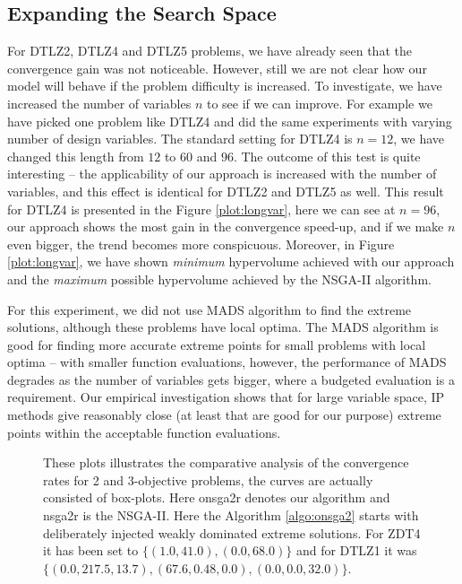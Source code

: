 \documentclass[journal]{IEEEtran}
\let\MYoriglatexcaption\caption
\renewcommand{\caption}[2][\relax]{\MYoriglatexcaption[#2]{#2}}
\begin{document}
\subsection{Expanding the Search Space} 
\label{subsec:longvar}
For DTLZ2, DTLZ4 and DTLZ5 problems, we have already seen that the convergence gain was not noticeable. However, still we are not clear how our model will behave if the problem difficulty is increased. To investigate, we have increased the number of variables \(n\) to see if we can improve. For example we have picked one problem like DTLZ4 and did the same experiments with varying number of design variables. The standard setting for DTLZ4 is \(n = 12\), we have changed this length from \(12\) to \(60\) and \(96\). The outcome of this test is quite interesting -- the applicability of our approach is increased with the number of variables, and this effect is identical for DTLZ2 and DTLZ5 as well. This result for DTLZ4 is presented in the Figure \ref{plot:longvar}, here we can see at \(n = 96\), our approach shows the most gain in the convergence speed-up, and if we make \(n\) even bigger, the trend becomes more conspicuous. Moreover, in Figure \ref{plot:longvar}, we have shown \textit{minimum} hypervolume achieved with our approach and the \textit{maximum} possible hypervolume achieved by the NSGA-II algorithm.

For this experiment, we did not use MADS algorithm to find the extreme solutions, although these problems have local optima. The MADS algorithm is good for finding more accurate extreme points for small problems with local optima -- with smaller function evaluations, however, the performance of MADS degrades as the number of variables gets bigger, where a budgeted evaluation is a requirement. Our empirical investigation shows that for large variable space, IP methods give reasonably close (at least that are good for our purpose) extreme points within the acceptable function evaluations.

%
\begin{figure*}[!htp]
	\centering
	\hfill
	\caption{These plots illustrates the comparative analysis of the convergence rates for 2 and 3-objective problems, the curves are actually consisted of box-plots. Here onsga2r denotes our algorithm and nsga2r is the NSGA-II. Here the Algorithm \ref{algo:onsga2} starts with deliberately injected weakly dominated extreme solutions. For ZDT4 it has been set to \(\{(1.0, 41.0), (0.0, 68.0)\}\) and for DTLZ1 it was \(\{(0.0, 217.5, 13.7),(67.6, 0.48, 0.0),(0.0, 0.0, 32.0)\}\).}
	\label{plot:weak-hv}
\end{figure*}
%
\end{document}
